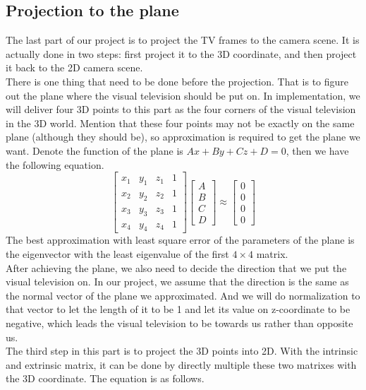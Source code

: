 \documentclass[paper=a4, fontsize=14pt]{scrartcl}
\numberwithin{equation}{section}		%
\numberwithin{figure}{section}			%
\numberwithin{table}{section}				%
\begin{document}
\subsection{Projection to the plane}
The last part of our project is to project the TV frames to the camera scene. It is actually done in two steps: first project it to the 3D coordinate, and then project it back to the 2D camera scene.\\
\indent There is one thing that need to be done before the projection. That is to figure out the plane where the visual television should be put on. In implementation, we will deliver four 3D points to this part as the four corners of the visual television in the 3D world. Mention that these four points may not be exactly on the same plane (although they should be), so approximation is required to get the plane we want. Denote the function of the plane is $Ax+By+Cz+D = 0$, then we have the following equation.
$$\begin{bmatrix}
x_1 & y_1 & z_1 & 1\\
x_2 & y_2 & z_2 & 1\\
x_3 & y_3 & z_3 & 1\\
x_4 & y_4 & z_4 & 1\end{bmatrix}
\begin{bmatrix}A \\ B \\ C \\ D\end{bmatrix} 
\approx \begin{bmatrix}0 \\ 0 \\ 0 \\ 0
\end{bmatrix} $$
\indent The best approximation with least square error of the parameters of the plane is the eigenvector with the least eigenvalue of the first $4 \times 4$ matrix.\\
\indent After achieving the plane, we also need to decide the direction that we put the visual television on. In our project, we assume that the direction is the same as the normal vector of the plane we approximated. And we will do normalization to that vector to let the length of it to be 1 and let its value on z-coordinate to be negative, which leads the visual television to be towards us rather than opposite us.\\
\indent The third step in this part is to project the 3D points into 2D. With the intrinsic and extrinsic matrix, it can be done by directly multiple these two matrixes with the 3D coordinate. The equation is as follows.
\end{document}
